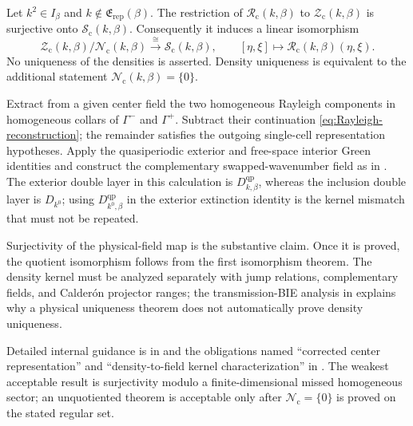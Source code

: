 \begin{theorem}
\label{thm:center-representation}
Let $k^2\in I_\beta$ and $k\notin\mathfrak E_{\mathrm{rep}}(\beta)$.  The
restriction of $\mathcal R_{\mathrm c}(k,\beta)$ to
$\mathcal Z_{\mathrm c}(k,\beta)$ is surjective onto
$\mathcal S_{\mathrm c}(k,\beta)$.  Consequently it induces a linear
isomorphism
\begin{equation}
  \mathcal Z_{\mathrm c}(k,\beta)/\mathcal N_{\mathrm c}(k,\beta)
  \xrightarrow{\ \cong\ }\mathcal S_{\mathrm c}(k,\beta),
  \qquad [\eta,\xi]\longmapsto\mathcal R_{\mathrm c}(k,\beta)(\eta,\xi).
  \label{eq:center-quotient-isomorphism}
\end{equation}
No uniqueness of the densities is asserted.  Density uniqueness is equivalent
to the additional statement $\mathcal N_{\mathrm c}(k,\beta)=\{0\}$.
\end{theorem}
\begin{proofroadmap}
Extract from a given center field the two homogeneous Rayleigh components in
homogeneous collars of $\Gamma^-$ and $\Gamma^+$.  Subtract their continuation
\eqref{eq:Rayleigh-reconstruction}; the remainder satisfies the outgoing
single-cell representation hypotheses.  Apply the quasiperiodic exterior and
free-space interior Green identities and construct the complementary
swapped-wavenumber field as in
\cite[Theorem~4 and Appendix~A, Lemmas~9--10]{BarnettGreengard2010}.  The
exterior double layer in this calculation is
$D^{\mathrm{qp}}_{k,\beta}$, whereas the inclusion double layer is $D_{k^0}$;
using $D^{\mathrm{qp}}_{k^0,\beta}$ in the exterior extinction identity is the
kernel mismatch that must not be repeated.

Surjectivity of the physical-field map is the substantive claim.  Once it is
proved, the quotient isomorphism follows from the first isomorphism theorem.
The density kernel must be analyzed separately with jump relations,
complementary fields, and Calder\'on projector ranges; the transmission-BIE
analysis in \cite[Lemmas~2.2--2.6]{HiptmairMoiolaSpence2022} explains why a
physical uniqueness theorem does not automatically prove density uniqueness.

Detailed internal guidance is in
 and the
obligations named ``corrected center representation'' and
``density-to-field kernel characterization'' in
.  The weakest
acceptable result is surjectivity modulo a finite-dimensional missed
homogeneous sector; an unquotiented theorem is acceptable only after
$\mathcal N_{\mathrm c}=\{0\}$ is proved on the stated regular set.
\end{proofroadmap}
